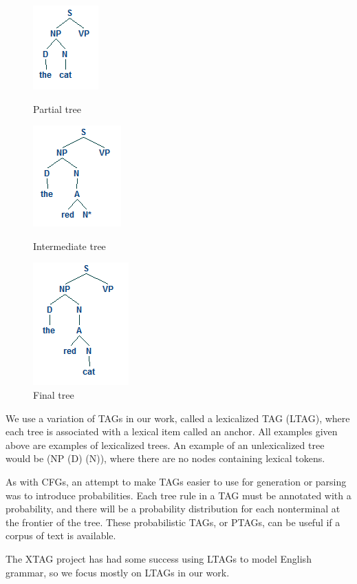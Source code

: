 \begin{figure}[ht]
\centering
\begin{minipage}[b]{0.3\linewidth}
\includegraphics{tree-1.png}
\caption{Partial tree}
\label{tree-1}
\end{minipage}
\quad
\begin{minipage}[b]{0.3\linewidth}
\includegraphics{tree-2.png}
\caption{Intermediate tree}
\label{tree-2}
\end{minipage}
\quad
\begin{minipage}[b]{0.3\linewidth}
\includegraphics{tree-3.png}
\caption{Final tree}
\label{tree-3}
\end{minipage}
\end{figure}

We use a variation of TAGs in our work, called a lexicalized TAG (LTAG), where each tree is
associated with a lexical item called an anchor.  All examples given above are examples of
lexicalized trees.  An example of an unlexicalized tree would be (NP (D) (N)), where there
are no nodes containing lexical tokens.

As with CFGs, an attempt to make TAGs easier to use for generation or parsing was to
introduce probabilities.  Each tree rule in a TAG must be annotated with a probability, and
there will be a probability distribution for each nonterminal at the frontier of the tree.
These probabilistic TAGs, or PTAGs, can be useful if a corpus of text is available.

The XTAG project has had some success using LTAGs to model English grammar\cite{xtag}, 
so we focus mostly on LTAGs in our work.